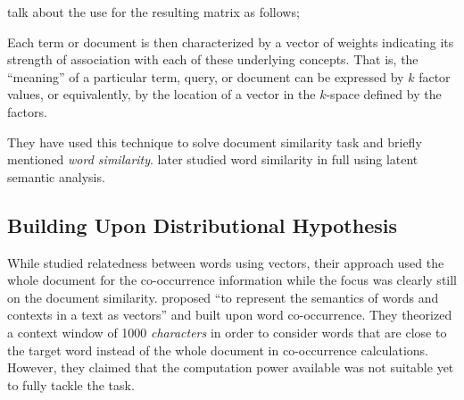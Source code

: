 \citeauthor{deerwester_indexing_1990} talk about the use for the resulting matrix as follows;
\begin{displayquote}
    Each term or document is then characterized by a vector of weights indicating its strength of association with each of these underlying concepts.
    That is, the \enquote{meaning} of a particular term, query, or document can be expressed by $k$ factor values, or equivalently, by the location of a vector in the $k$-space defined by the factors.
\end{displayquote}
They have used this technique to solve document similarity task and briefly mentioned \emph{word similarity}.
\textcite{landauer_solution_1997} later studied word similarity in full using latent semantic analysis.

\subsection{Building Upon Distributional Hypothesis}%
\label{sub:building_upon_distributional_hypothesis}

While \citeauthor{deerwester_indexing_1990} studied relatedness between words using vectors, their approach used the whole document for the co-occurrence information while the focus was clearly still on the document similarity.
\textcite{schutze_dimensions_1992} proposed \enquote{to represent the semantics of words and contexts in a text as vectors} and built upon word co-occurrence.
They theorized a context window of 1000 \emph{characters} in order to consider words that are close to the target word instead of the whole document in co-occurrence calculations.
However, they claimed that the computation power available was not suitable yet to fully tackle the task.

